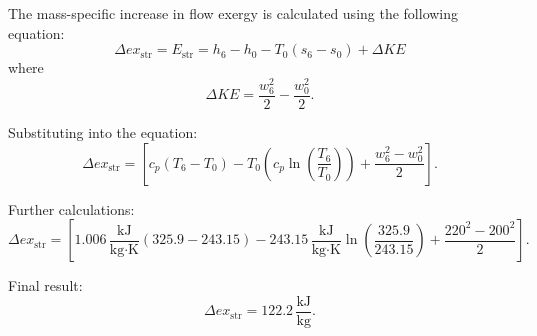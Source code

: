 The mass-specific increase in flow exergy is calculated using the following equation:  
\[
\Delta ex_{\text{str}} = E_{\text{str}} = h_6 - h_0 - T_0 (s_6 - s_0) + \Delta KE
\]  
where  
\[
\Delta KE = \frac{w_6^2}{2} - \frac{w_0^2}{2}.
\]  

Substituting into the equation:  
\[
\Delta ex_{\text{str}} = \left[ c_p (T_6 - T_0) - T_0 \left( c_p \ln \left( \frac{T_6}{T_0} \right) \right) + \frac{w_6^2 - w_0^2}{2} \right].
\]  

Further calculations:  
\[
\Delta ex_{\text{str}} = \left[ 1.006 \, \frac{\text{kJ}}{\text{kg·K}} (325.9 - 243.15) - 243.15 \, \frac{\text{kJ}}{\text{kg·K}} \ln \left( \frac{325.9}{243.15} \right) + \frac{220^2 - 200^2}{2} \right].
\]  

Final result:  
\[
\Delta ex_{\text{str}} = 122.2 \, \frac{\text{kJ}}{\text{kg}}.
\]